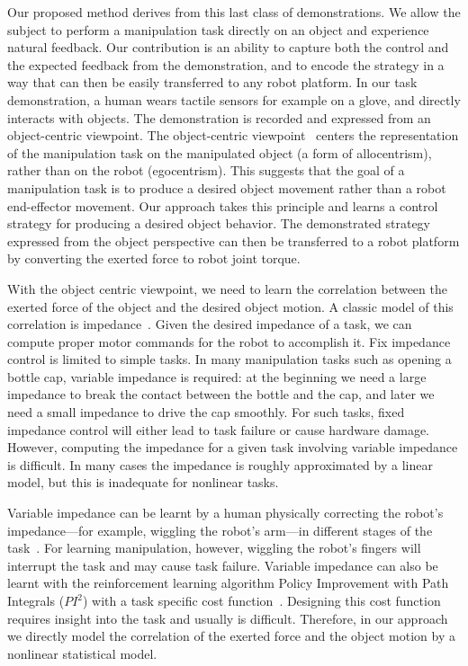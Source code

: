 Our proposed method derives from this last class of demonstrations.
We allow the subject to perform a manipulation task directly on an
object and experience natural feedback.  Our contribution is an
ability to capture both the control and the expected feedback from the
demonstration, and to encode the strategy in a way that can then be
easily transferred to any robot platform. In our task demonstration, a
human wears tactile sensors for example on a glove, and directly
interacts with objects. The demonstration is recorded and expressed
from an object-centric viewpoint. The object-centric
viewpoint~\citep{okamura2000overview,jain2013improving,Miao2014}
centers the representation of the manipulation task on the manipulated
object (a form of allocentrism), rather than on the robot (egocentrism). This
suggests that the goal of a manipulation task is to produce a desired
object movement rather than a robot end-effector movement. Our
approach takes this principle and learns a control strategy for
producing a desired object behavior.  The demonstrated strategy
expressed from the object perspective can then be transferred to a
robot platform by converting %
the exerted force to robot joint torque.

With the object centric viewpoint, we need to learn the correlation
between the exerted force of the object and the desired object
motion. A classic model of this correlation is
impedance~\citep{howard2010transferring,wimbock2012comparison}. Given
the desired impedance of a task, we can compute proper motor commands
for the robot to accomplish it. Fix impedance control is limited to
simple tasks. In many manipulation tasks such as opening a bottle cap,
variable impedance is required: at the beginning we need a large
impedance to break the contact between the bottle and the cap, and
later we need a small impedance to drive the cap smoothly. For such
tasks, fixed impedance control will either lead to task failure or cause
hardware damage.  However, computing the impedance for a given task
involving variable impedance is difficult.  In many cases the
impedance is roughly approximated by a linear model, but this is
inadequate for nonlinear tasks. %


Variable impedance can be learnt by a human physically correcting the
robot's impedance---for example, wiggling the robot's arm---in different stages of
the task~\citep{kronander2012online}. For learning manipulation,
however, wiggling the robot's fingers will interrupt the task and may
cause task failure.
Variable impedance can also be learnt with the reinforcement learning
algorithm Policy Improvement with Path Integrals ($PI^2$) with a task
specific cost function~\citep{buchli2011learning}. Designing this cost
function requires insight into the task and usually is
difficult. Therefore, in our approach we directly model the
correlation of the exerted force and the object motion by a nonlinear
statistical model.


